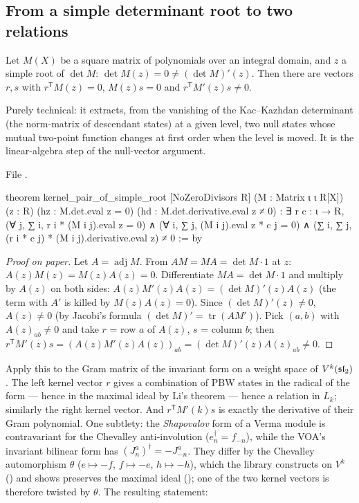 \subsection{From a simple determinant root to two relations}

\begin{lemma}\label{l09:lem:kernelpair}
Let $M(X)$ be a square matrix of polynomials over an integral domain, and $z$ a simple root of
$\det M$: $\det M(z) = 0\neq(\det M)'(z)$. Then there are vectors $r,s$ with $r^{\mathsf T}M(z) = 0$,
$M(z)s = 0$ and $r^{\mathsf T}M'(z)s\neq0$.
\end{lemma}
\begin{physics}
Purely technical: it extracts, from the vanishing of the Kac--Kazhdan determinant (the norm-matrix of
descendant states) at a given level, two null states whose mutual two-point function changes at first order
when the level is moved. It is the linear-algebra step of the null-vector argument.
\end{physics}


\noindent File .
\begin{leancode}
theorem kernel_pair_of_simple_root [NoZeroDivisors R]
    (M : Matrix ι ι R[X]) (z : R)
    (hz : M.det.eval z = 0) (hd : M.det.derivative.eval z ≠ 0) :
    ∃ r c : ι → R,
      (∀ j, ∑ i, r i * (M i j).eval z = 0) ∧
      (∀ i, ∑ j, (M i j).eval z * c j = 0) ∧
      (∑ i, ∑ j, (r i * c j) * (M i j).derivative.eval z) ≠ 0 := by
\end{leancode}

\begin{proof}[Proof on paper]
Let $A = \operatorname{adj}M$. From $AM = MA = \det M\cdot 1$ at $z$: $A(z)M(z) = M(z)A(z) = 0$. Differentiate
$MA = \det M\cdot1$ and multiply by $A(z)$ on both sides: $A(z)M'(z)A(z) = (\det M)'(z)A(z)$ (the
term with $A'$ is killed by $M(z)A(z)=0$). Since $(\det M)'(z)\neq0$, $A(z)\neq0$ (by Jacobi's formula
$(\det M)' = \operatorname{tr}(A M')$). Pick $(a,b)$ with $A(z)_{ab}\neq0$ and take $r$ = row $a$ of $A(z)$,
$s$ = column $b$; then $r^{\mathsf T}M'(z)s = (A(z)M'(z)A(z))_{ab} = (\det M)'(z)A(z)_{ab}\neq0$.
\end{proof}

Apply this to the Gram matrix of the invariant form on a weight space of $V^k(\mathfrak{sl}_2)$. The left
kernel vector $r$ gives a combination of PBW states in the radical of the form --- hence in the maximal
ideal by Li's theorem --- hence a relation in $L_k$; similarly the right kernel vector. And
$r^{\mathsf T}M'(k)s$ is exactly the derivative of their Gram polynomial. One subtlety: the
\emph{Shapovalov} form of a Verma module is contravariant for the Chevalley anti-involution ($e_n^\dagger
= f_{-n}$), while the VOA's invariant bilinear form has $(J^a_n)^\dagger = -J^a_{-n}$. They differ by the
Chevalley automorphism $\theta$ ($e\mapsto -f$, $f\mapsto-e$, $h\mapsto-h$), which the library constructs on
$V^k$ () and shows preserves the maximal ideal ();
one of the two kernel vectors is therefore twisted by $\theta$. The resulting statement:


